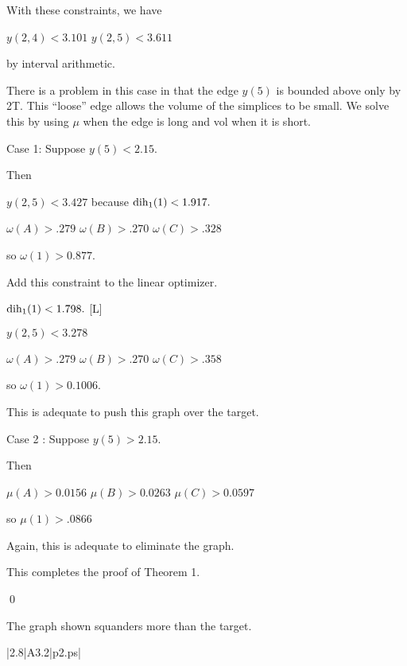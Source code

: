 With these constraints, we have

$y(2,4) < 3.101$ \newline
$y(2,5) < 3.611$ \newline

by interval arithmetic.

There is a problem in this case in that the edge $y(5)$ is bounded above only by 2T.  This ``loose'' edge allows the volume of the simplices to be small.
We solve this by using $\mu$ when the edge is long and vol when it is short.

Case 1: Suppose $y(5)<2.15$.

Then 

$y(2,5)<3.427$ because $\operatorname{dih}_1(1)<1.917.$

$\omega(A)>.279$ \newline
$\omega(B)>.270$ \newline
$\omega(C)>.328$ \newline

so $\omega(1)>0.877.$  

Add this constraint to the linear optimizer.

$\operatorname{dih}_1(1)<1.798.$ [L]

$y(2,5)<3.278$

$\omega(A)>.279$ \newline
$\omega(B)>.270$ \newline
$\omega(C)>.358$ \newline

so $\omega(1)>0.1006.$ 

This is adequate to push this graph over the target.

Case 2 : Suppose $y(5)>2.15.$

Then

$\mu(A)>0.0156$ \newline
$\mu(B)>0.0263$ \newline
$\mu(C)>0.0597$ \newline

so $\mu(1)>.0866$

Again, this is adequate to eliminate the graph.

This completes the proof of Theorem 1.

\qed



\bigskip



 The graph shown 
squanders more than the target.  \endproclaim

\gram|2.8|A3.2|p2.ps|  %

